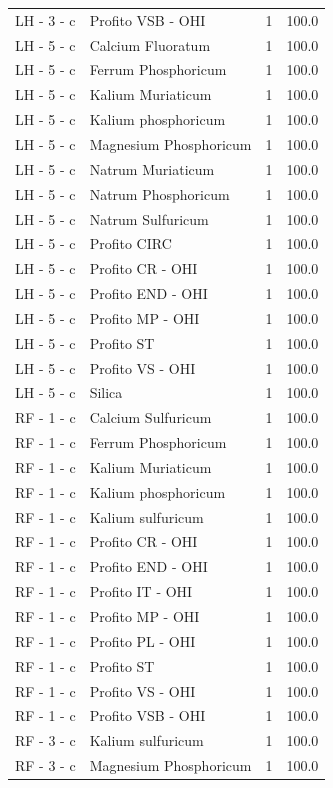 \documentclass[a4paper,11pt]{article}
\begin{document}
\begin{footnotesize}
\begin{longtable}{p{3.5cm}p{7.5cm}rr}
LH - 3 - c & Profito VSB - OHI & 1 & 100.0 \\
LH - 5 - c & Calcium Fluoratum & 1 & 100.0 \\
LH - 5 - c & Ferrum Phosphoricum & 1 & 100.0 \\
LH - 5 - c & Kalium Muriaticum & 1 & 100.0 \\
LH - 5 - c & Kalium phosphoricum & 1 & 100.0 \\
LH - 5 - c & Magnesium Phosphoricum & 1 & 100.0 \\
LH - 5 - c & Natrum Muriaticum & 1 & 100.0 \\
LH - 5 - c & Natrum Phosphoricum & 1 & 100.0 \\
LH - 5 - c & Natrum Sulfuricum & 1 & 100.0 \\
LH - 5 - c & Profito CIRC & 1 & 100.0 \\
LH - 5 - c & Profito CR - OHI & 1 & 100.0 \\
LH - 5 - c & Profito END - OHI & 1 & 100.0 \\
LH - 5 - c & Profito MP - OHI & 1 & 100.0 \\
LH - 5 - c & Profito ST & 1 & 100.0 \\
LH - 5 - c & Profito VS - OHI & 1 & 100.0 \\
LH - 5 - c & Silica & 1 & 100.0 \\
RF - 1 - c & Calcium Sulfuricum & 1 & 100.0 \\
RF - 1 - c & Ferrum Phosphoricum & 1 & 100.0 \\
RF - 1 - c & Kalium Muriaticum & 1 & 100.0 \\
RF - 1 - c & Kalium phosphoricum & 1 & 100.0 \\
RF - 1 - c & Kalium sulfuricum & 1 & 100.0 \\
RF - 1 - c & Profito CR - OHI & 1 & 100.0 \\
RF - 1 - c & Profito END - OHI & 1 & 100.0 \\
RF - 1 - c & Profito IT - OHI & 1 & 100.0 \\
RF - 1 - c & Profito MP - OHI & 1 & 100.0 \\
RF - 1 - c & Profito PL - OHI & 1 & 100.0 \\
RF - 1 - c & Profito ST & 1 & 100.0 \\
RF - 1 - c & Profito VS - OHI & 1 & 100.0 \\
RF - 1 - c & Profito VSB - OHI & 1 & 100.0 \\
RF - 3 - c & Kalium sulfuricum & 1 & 100.0 \\
RF - 3 - c & Magnesium Phosphoricum & 1 & 100.0 \\

\end{longtable}
\end{footnotesize}
\end{document}
